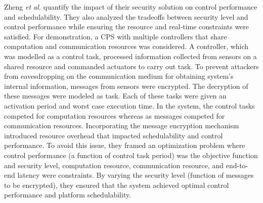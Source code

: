 Zheng \textit{et al.} \cite{ZDRP16} quantify the impact of their security solution on control performance and schedulability. They also analyzed the tradeoffs between security level and control performance while ensuring the resource and real-time constraints were satisfied. For demonstration, a CPS with multiple controllers that share computation and communication resources was considered. A controller, which was modelled as a control task, processed information collected from sensors on a shared resource and commanded actuators to carry out task. To prevent attackers from eavesdropping on the communication medium for obtaining system's internal information, messages from sensors were encrypted. The decryption of these messages were modeled as task. Each of these tasks were given an activation period and worst case execution time. In the system, the control tasks competed for computation resources whereas as messages competed for communication resources. Incorporating the message encryption mechanism introduced resource overhead that impacted schedulability and control performance. To avoid this issue, they framed an optimization problem where control performance (a function of control task period) was the objective function and security level, computation resource, communication resource, and end-to-end latency were constraints. By varying the security level (function of messages to be encrypted), they ensured that the system achieved optimal control performance and platform schedulability. 

